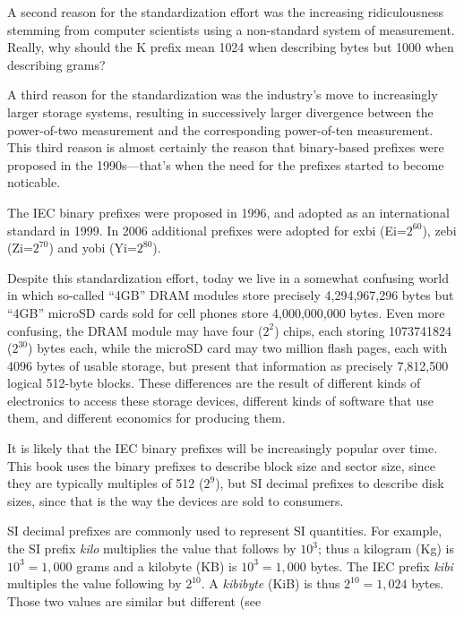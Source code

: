 A second reason for the standardization effort was the increasing
ridiculousness stemming from computer scientists using
a non-standard system of measurement. Really, why should the K prefix
mean 1024 when describing bytes but 1000 when describing grams?

A third reason for the standardization was the industry's move to
increasingly larger storage systems, resulting in successively larger
divergence between the power-of-two measurement and the corresponding
power-of-ten measurement. This third reason is almost certainly the
reason that binary-based prefixes were proposed in the 1990s---that's
when the need for the prefixes started to become noticable.

The IEC binary prefixes were proposed in 1996\cite{iec:1996}, and
adopted as an international standard in 1999.  In 2006 additional
prefixes were adopted for exbi (Ei=$2^{60}$), zebi (Zi=$2^{70}$) and
yobi (Yi=$2^{80}$)\cite{iec:80000-13:2008}.

Despite this standardization effort, today we live in a somewhat
confusing world in which so-called ``4GB'' DRAM modules 
store precisely 4,294,967,296 bytes
but ``4GB'' microSD cards sold for cell
phones store 4,000,000,000 bytes. Even more confusing, the DRAM
module may have four ($2^{2}$) chips, each storing 1073741824
($2^{30}$) bytes each, while the microSD card may two million flash
pages, each with 4096 bytes of usable storage, but present that
information as precisely 7,812,500 logical 512-byte blocks.  These
differences are the result of different kinds of electronics to access
these storage devices, different kinds of software that use them, and
different economics for producing them. 

It is likely that the IEC binary prefixes will be increasingly popular
over time. This book uses the binary prefixes to describe block size
and sector size, since they are typically multiples of 512 ($2^9$),
but SI decimal prefixes to describe disk sizes, since that is the way
the devices are sold to consumers.

SI decimal prefixes are commonly used to represent SI
quantities. For example, the SI prefix \emph{kilo} multiplies the value that follows by
$10^3$; thus a kilogram (Kg) is
$10^3=1,000$ grams and a kilobyte (KB) is
$10^3=1,000$ bytes. The IEC prefix \emph{kibi} multiples the value following by $2^{10}$. A \emph{kibibyte}
(KiB) is thus $2^{10}=1,024$ bytes. Those two values are similar but
different (see 

